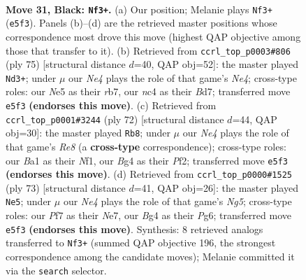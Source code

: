 \documentclass[11pt]{article}
\begin{document}
\clearpage

\begin{figure}[p]\centering
\begin{subfigure}{0.46\textwidth}\centering
\resizebox{\linewidth}{!}{%
\newchessgame
\chessboard[
  setfen={8/1R3pk1/p1p5/P3n1p1/1PN1P1b1/8/8/b3KB2 b - - 0 31},
  showmover=false,
  pgfstyle=straightmove, color=movearrow, markmove={e5-f3}
]}
\caption{}
\end{subfigure}\hfill
\begin{subfigure}{0.46\textwidth}\centering
\resizebox{\linewidth}{!}{%
\newchessgame
\chessboard[
  setfen={5k2/1R1b4/p3p3/3nn1P1/2p2pN1/P7/1K6/3B4 b - - 2 38},
  showmover=false,
  pgfstyle=straightmove, color=movearrow, markmove={e5-d3}
]}
\caption{}
\end{subfigure}
\\[4pt]
\begin{subfigure}{0.46\textwidth}\centering
\resizebox{\linewidth}{!}{%
\newchessgame
\chessboard[
  setfen={4R3/1p3pkb/2p1r3/p7/P5P1/3nB3/5P1P/5NK1 w - - 4 37},
  showmover=false,
  pgfstyle=straightmove, color=movearrow, markmove={e8-b8}
]}
\caption{}
\end{subfigure}\hfill
\begin{subfigure}{0.46\textwidth}\centering
\resizebox{\linewidth}{!}{%
\newchessgame
\chessboard[
  setfen={2b2k2/4n2p/2p3p1/8/2PN2n1/1N4P1/4B2P/7K b - - 0 37},
  showmover=false,
  pgfstyle=straightmove, color=movearrow, markmove={g4-e5}
]}
\caption{}
\end{subfigure}
\caption{\textbf{Move 31, Black: \texttt{Nf3+}.} (a) Our position; Melanie plays \texttt{Nf3+} (\texttt{e5f3}). Panels (b)--(d) are the retrieved master positions whose correspondence most drove this move (highest QAP objective among those that transfer to it). (b) Retrieved from \texttt{ccrl\_top\_p0003\#806} (ply 75) [structural distance $d$=40, QAP obj=52]: the master played \texttt{Nd3+}; under $\mu$ our \emph{Ne4} plays the role of that game's \emph{Ne4}; cross-type roles: our \emph{N}e5 as their \emph{r}b7, our \emph{n}c4 as their \emph{B}d7; transferred move \texttt{e5f3} \textbf{(endorses this move)}. (c) Retrieved from \texttt{ccrl\_top\_p0001\#3244} (ply 72) [structural distance $d$=44, QAP obj=30]: the master played \texttt{Rb8}; under $\mu$ our \emph{Ne4} plays the role of that game's \emph{Re8} (a \textbf{cross-type} correspondence); cross-type roles: our \emph{B}a1 as their \emph{N}f1, our \emph{B}g4 as their \emph{P}f2; transferred move \texttt{e5f3} \textbf{(endorses this move)}. (d) Retrieved from \texttt{ccrl\_top\_p0000\#1525} (ply 73) [structural distance $d$=41, QAP obj=26]: the master played \texttt{Ne5}; under $\mu$ our \emph{Ne4} plays the role of that game's \emph{Ng5}; cross-type roles: our \emph{P}f7 as their \emph{N}e7, our \emph{B}g4 as their \emph{P}g6; transferred move \texttt{e5f3} \textbf{(endorses this move)}. Synthesis: 8 retrieved analogs transferred to \texttt{Nf3+} (summed QAP objective 196, the strongest correspondence among the candidate moves); Melanie committed it via the \texttt{search} selector.}
\label{fig:thought-m61}
\end{figure}
\end{document}
